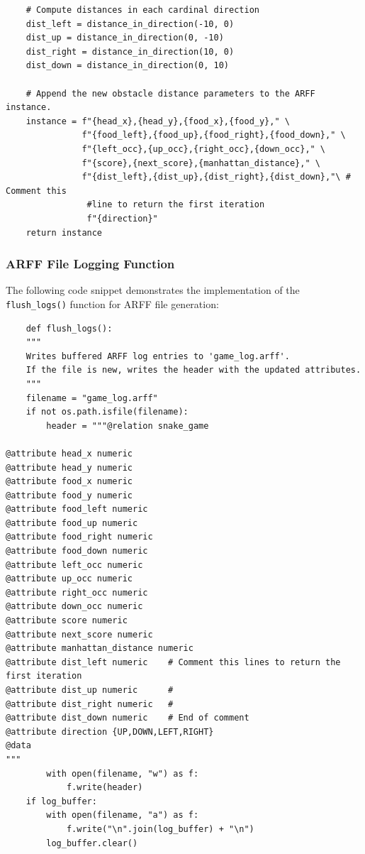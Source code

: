 \documentclass[12pt,a4paper]{article}
\begin{document}
\begin{verbatim}
    # Compute distances in each cardinal direction
    dist_left = distance_in_direction(-10, 0)
    dist_up = distance_in_direction(0, -10)
    dist_right = distance_in_direction(10, 0)
    dist_down = distance_in_direction(0, 10)

    # Append the new obstacle distance parameters to the ARFF instance.
    instance = f"{head_x},{head_y},{food_x},{food_y}," \
               f"{food_left},{food_up},{food_right},{food_down}," \
               f"{left_occ},{up_occ},{right_occ},{down_occ}," \
               f"{score},{next_score},{manhattan_distance}," \
               f"{dist_left},{dist_up},{dist_right},{dist_down},"\ # Comment this 
                #line to return the first iteration
                f"{direction}"
    return instance
\end{verbatim}

\subsubsection{ARFF File Logging Function}
\label{sec:arff-logging}
The following code snippet demonstrates the implementation of the \texttt{flush\_logs()} function for ARFF file generation:

\begin{verbatim}
    def flush_logs():
    """
    Writes buffered ARFF log entries to 'game_log.arff'.
    If the file is new, writes the header with the updated attributes.
    """
    filename = "game_log.arff"
    if not os.path.isfile(filename):
        header = """@relation snake_game

@attribute head_x numeric
@attribute head_y numeric
@attribute food_x numeric
@attribute food_y numeric
@attribute food_left numeric
@attribute food_up numeric
@attribute food_right numeric
@attribute food_down numeric
@attribute left_occ numeric
@attribute up_occ numeric
@attribute right_occ numeric
@attribute down_occ numeric
@attribute score numeric
@attribute next_score numeric
@attribute manhattan_distance numeric
@attribute dist_left numeric    # Comment this lines to return the first iteration
@attribute dist_up numeric      #
@attribute dist_right numeric   #
@attribute dist_down numeric    # End of comment
@attribute direction {UP,DOWN,LEFT,RIGHT}
@data
"""
        with open(filename, "w") as f:
            f.write(header)
    if log_buffer:
        with open(filename, "a") as f:
            f.write("\n".join(log_buffer) + "\n")
        log_buffer.clear()

\end{verbatim}
\end{document}
